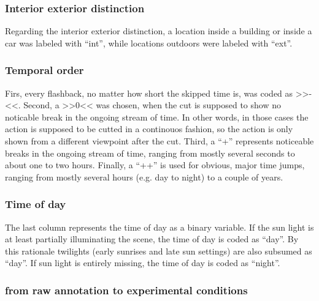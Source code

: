 \documentclass[10pt,a4paper,twocolumn]{article}
\begin{document}
\subsubsection*{Interior exterior distinction }

Regarding the interior exterior distinction, a location inside a building
or inside a car was labeled with ``int'', while locations outdoors
were labeled with ``ext''. 


\subsubsection*{Temporal order}

Firs, every flashback, no matter how short the skipped time is, was
coded as >>-<<. Second, a >>0<< was chosen, when the cut is supposed
to show no noticable break in the ongoing stream of time. In other
words, in those cases the action is supposed to be cutted in a continouos
fashion, so the action is only shown from a different viewpoint after
the cut. Third, a ``+'' represents noticeable breaks in the ongoing
stream of time, ranging from mostly several seconds to about one to
two hours. Finally, a ``++'' is used for obvious, major time jumps,
ranging from mostly several hours (e.g. day to night) to a couple
of years.


\subsubsection*{Time of day }

The last column represents the time of day as a binary variable. If
the sun light is at least partially illuminating the scene, the time
of day is coded as ``day''. By this rationale twilights (early sunrises
and late sun settings) are also subsumed as ``day''. If sun light
is entirely missing, the time of day is coded as ``night''. 


\subsubsection*{from raw annotation to experimental conditions}

\end{document}
